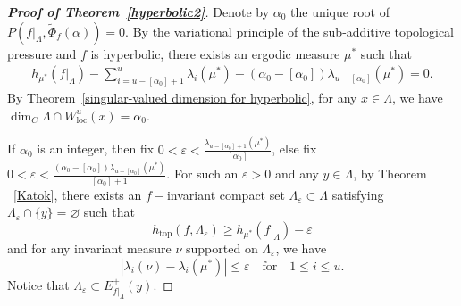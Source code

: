 \documentclass[11pt,a4paper]{amsart}
\theoremstyle{plain}
\theoremstyle{remark}
\begin{document}
	
	\begin{proof}[\textbf{Proof of Theorem~\ref{hyperbolic2}}]
		Denote by $\alpha_{0}$ the unique root of $P(f|_{\Lambda},\tilde{\Phi}_{f}(\alpha))=0$. By the variational principle of the sub-additive topological pressure and $f$ is hyperbolic, there exists an ergodic measure $\mu^{\ast}$ such that
		\begin{align*}
			h_{\mu^{\ast}}(f|_{\Lambda})-\sum^{u}_{i=u-[\alpha_{0}]+1}\lambda_{i}(\mu^{\ast})-(\alpha_{0}-[\alpha_{0}])\lambda_{u-[\alpha_{0}]}(\mu^{\ast})=0.
		\end{align*}
		By Theorem~\ref{singular-valued dimension for hyperbolic}, for any $x\in\Lambda$, we have $\dim_{C} \Lambda\cap W^{u}_{\text{loc}}(x)=\alpha_{0}$.
		
		If $\alpha_{0}$ is an integer, then fix $0<\varepsilon<\frac{\lambda_{u-[\alpha_{0}]+1}(\mu^{\ast})}{[\alpha_{0}]}$, else fix $0<\varepsilon< \frac{(\alpha_{0}-[\alpha_{0}])\lambda_{u-[\alpha_{0}]}(\mu^{\ast})}{[\alpha_{0}]+1}$.
		For such an  $\varepsilon>0$ and any $y\in \Lambda$, by Theorem ~\ref{Katok}, there exists an $f-$invariant compact set $\Lambda_{\varepsilon}\subset \Lambda$ satisfying $\Lambda_{\varepsilon}\cap \{y\}=\varnothing$ such that $$h_{\text{top}}(f,\Lambda_{\varepsilon})\geq h_{\mu^{\ast}}(f|_{\Lambda})-\varepsilon$$ and for any invariant measure $\nu$ supported on $\Lambda_{\varepsilon}$, we have $$|\lambda_{i}(\nu)-\lambda_{i}(\mu^{\ast})|\leq \varepsilon \quad \text{for}\quad 1\leq i\leq u.$$ Notice that $\Lambda_{\varepsilon}\subset E^{+}_{f|_{\Lambda}}(y)$.
		

\end{proof}
\end{document}
